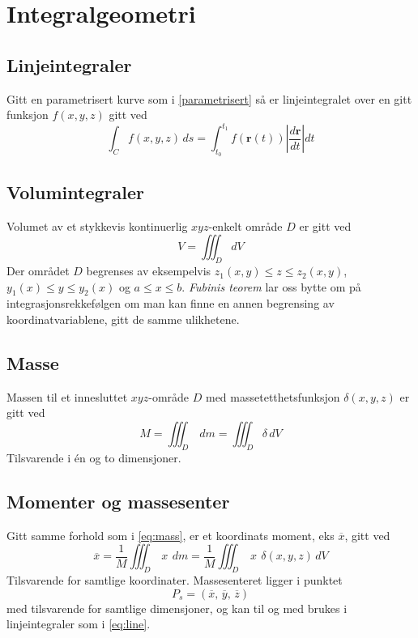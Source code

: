 \documentclass[fleqn,12pt]{wlscirep}
\begin{document}
\section{Integralgeometri}
\subsection{Linjeintegraler}
Gitt en parametrisert kurve som i \ref{parametrisert} så er linjeintegralet over en gitt funksjon $f(x,y,z)$ gitt ved 
\begin{equation}
    \int_C f(x,y,z) \, ds = \int_{t_0}^{t_1} f(\textbf{r}(t)) \left| \frac{d\textbf{r}}{dt} \right| dt \label{eq:line}
\end{equation}
\subsection{Volumintegraler}
Volumet av et stykkevis kontinuerlig $xyz$-enkelt område $D$ er gitt ved
\begin{equation}
    V = \iiint_D dV 
\end{equation}
Der området $D$ begrenses av eksempelvis $z_1(x,y)\leq z \leq z_2(x,y)$, $y_1(x) \leq y \leq y_2(x)$ og $a\leq x \leq b$. \textit{Fubinis teorem} lar oss bytte om på integrasjonsrekkefølgen om man kan finne en annen begrensing av koordinatvariablene, gitt de samme ulikhetene.
\subsection{Masse}
Massen til et innesluttet $xyz$-område $D$ med massetetthetsfunksjon $\delta (x,y,z)$ er gitt ved 
\begin{equation}
    M = \iiint_D \, dm = \iiint_D \delta \, dV \label{eq:mass}
\end{equation}
Tilsvarende i én og to dimensjoner.
\subsection{Momenter og massesenter}
Gitt samme forhold som i \ref{eq:mass}, er et koordinats moment, eks $\overline x$, gitt ved
\begin{equation}
    \overline{x} = \frac{1}{M} \iiint_D \,x\,\ dm= \frac{1}{M} \iiint_D  \ x\, \ \delta(x,y,z)\, dV
\end{equation}
Tilsvarende for samtlige koordinater.
Massesenteret ligger i punktet \begin{equation}
    P_s = (\overline x,\, \overline y,\, \overline z)
\end{equation}
med tilsvarende for samtlige dimensjoner, og kan til og med brukes i linjeintegraler som i \ref{eq:line}.
\end{document}
